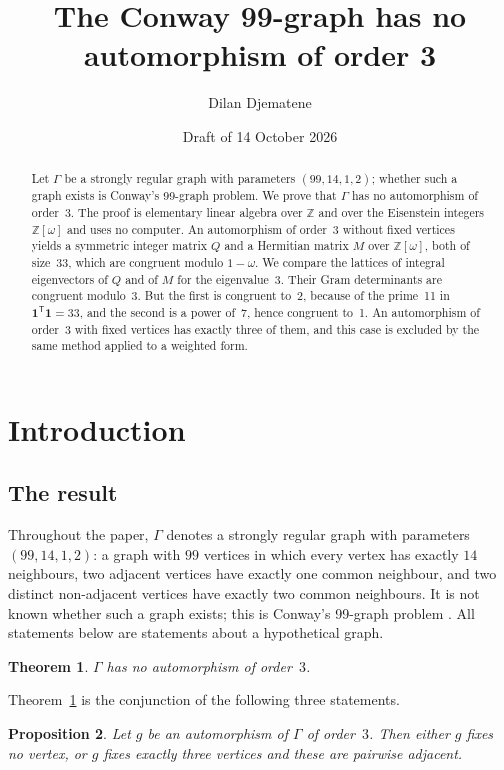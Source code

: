 \documentclass[11pt,a4paper]{article}
\title{The Conway 99-graph has no automorphism of order 3}
\author{Dilan Djematene}
\date{Draft of 14 October 2026}
\newtheorem{theorem}{Theorem}[section]
\newtheorem{proposition}[theorem]{Proposition}
\theoremstyle{remark}
\newcommand{\ZZ}{\mathbb{Z}}
\newcommand{\one}{\mathbf{1}}
\newcommand{\tp}{\mathsf{T}}
\begin{document}
\maketitle

\begin{abstract}
Let $\Gamma$ be a strongly regular graph with parameters $(99,14,1,2)$; whether such a graph exists is Conway's
99-graph problem. We prove that $\Gamma$ has no automorphism of order~3. The proof is elementary linear algebra over
$\ZZ$ and over the Eisenstein integers $\ZZ[\omega]$ and uses no computer. An automorphism of order~3 without fixed
vertices yields a symmetric integer matrix $Q$ and a Hermitian matrix $M$ over $\ZZ[\omega]$, both of size~33, which
are congruent modulo $1-\omega$. We compare the lattices of integral eigenvectors of $Q$ and of $M$ for the
eigenvalue~3. Their Gram determinants are congruent modulo~3. But the first is congruent to~2, because of the prime~11
in $\one^{\tp}\one=33$, and the second is a power of~7, hence congruent to~1. An automorphism of order~3 with fixed
vertices has exactly three of them, and this case is excluded by the same method applied to a weighted form.
\end{abstract}

\section{Introduction}

\subsection{The result}
Throughout the paper, $\Gamma$ denotes a strongly regular graph with parameters $(99,14,1,2)$: a graph with $99$
vertices in which every vertex has exactly $14$ neighbours, two adjacent vertices have exactly one common neighbour,
and two distinct non-adjacent vertices have exactly two common neighbours. It is not known whether such a graph
exists; this is Conway's 99-graph problem \cite{Co}. All statements below are statements about a hypothetical graph.

\begin{theorem}\label{thm:main}
$\Gamma$ has no automorphism of order~$3$.
\end{theorem}

Theorem~\ref{thm:main} is the conjunction of the following three statements.

\begin{proposition}\label{prop:fix}
Let $g$ be an automorphism of $\Gamma$ of order~$3$. Then either $g$ fixes no vertex, or $g$ fixes exactly three
vertices and these are pairwise adjacent.
\end{proposition}
\end{document}
